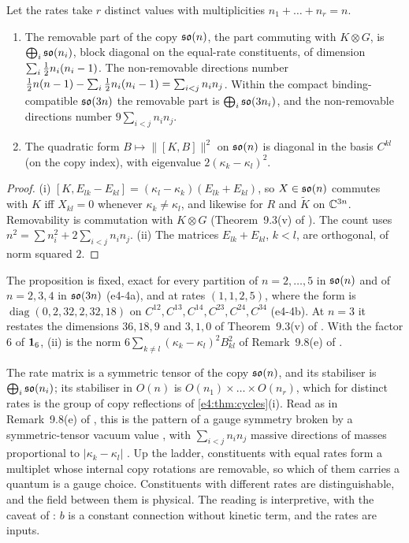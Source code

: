 \begin{proposition}
\label{e4:prop:rates}
Let the rates take $r$ distinct values with multiplicities $n_1+\dots+n_r=n$.
\begin{enumerate}[label=(\roman*),leftmargin=2.2em]
\item The removable part of the copy $\mathfrak{so}(n)$, the part commuting with $K\otimes G$, is $\bigoplus_i\mathfrak{so}(n_i)$, block diagonal on the equal-rate
constituents, of dimension $\sum_i\tfrac12 n_i(n_i-1)$. The non-removable directions number $\tfrac12 n(n-1)-\sum_i\tfrac12 n_i(n_i-1)=\sum_{i<j}n_in_j$. Within the
compact binding-compatible $\mathfrak{so}(3n)$ the removable part is $\bigoplus_i\mathfrak{so}(3n_i)$, and the non-removable directions number $9\sum_{i<j}n_in_j$.
\item The quadratic form $B\mapsto\|[K,B]\|^2$ on $\mathfrak{so}(n)$ is diagonal in the basis $C^{kl}$ (on the copy index), with eigenvalue $2(\kappa_k-\kappa_l)^2$.
\end{enumerate}
\end{proposition}

\begin{proof}
(i) $[K,E_{lk}-E_{kl}]=(\kappa_l-\kappa_k)(E_{lk}+E_{kl})$, so $X\in\mathfrak{so}(n)$ commutes with $K$ iff $X_{kl}=0$ whenever $\kappa_k\neq\kappa_l$, and likewise for $R$ and
$\tilde K$ on $\mathbb{C}^{3n}$. Removability is commutation with $K\otimes G$ (Theorem~9.3(v) of \cite{RE}). The count uses $n^2=\sum n_i^2+2\sum_{i<j}n_in_j$. (ii) The
matrices $E_{lk}+E_{kl}$, $k<l$, are orthogonal, of norm squared $2$.
\end{proof}

The proposition is fixed, exact for every partition of $n=2,\dots,5$ in $\mathfrak{so}(n)$ and of $n=2,3,4$ in $\mathfrak{so}(3n)$ (e4-4a), and at rates $(1,1,2,5)$, where the
form is $\operatorname{diag}(0,2,32,2,32,18)$ on $C^{12},C^{13},C^{14},C^{23},C^{24},C^{34}$ (e4-4b). At $n=3$ it restates the dimensions $36,18,9$ and $3,1,0$ of
Theorem~9.3(v) of \cite{RE}. With the factor $6$ of $\mathbf 1_6$, (ii) is the norm $6\sum_{k\neq l}(\kappa_k-\kappa_l)^2B_{kl}^2$ of Remark~9.8(e) of \cite{RE}.

\begin{remark}
\label{e4:rem:higgs}
The rate matrix is a symmetric tensor of the copy $\mathfrak{so}(n)$, and its stabiliser is $\bigoplus_i\mathfrak{so}(n_i)$; its stabiliser in $O(n)$ is
$O(n_1)\times\dots\times O(n_r)$, which for distinct rates is the group of copy reflections of \cref{e4:thm:cycles}(i). Read as in Remark~9.8(e) of
\cite{RE}, this is the pattern of a gauge symmetry broken by a symmetric-tensor vacuum value \cite{LiLF74}, with $\sum_{i<j}n_in_j$ massive directions
of masses proportional to $|\kappa_k-\kappa_l|$ \cite{EnglertBrout64,Higgs64,Kibble67}. Up the ladder, constituents with equal rates form a multiplet
whose internal copy rotations are removable, so which of them carries a quantum is a gauge choice. Constituents with different rates are
distinguishable, and the field between them is physical. The reading is interpretive, with the caveat of \cite{RE}: $b$ is a constant connection
without kinetic term, and the rates are inputs.
\end{remark}

